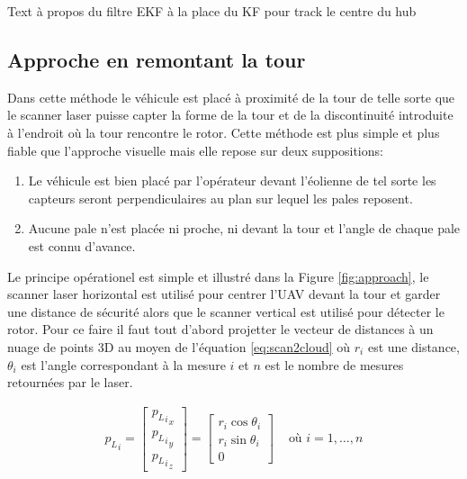 \color{red}
Text à propos du filtre EKF à la place du KF pour track le centre du hub
\color{black}

\subsection{Approche en remontant la tour}
\label{subsec:laser_tower}


Dans cette méthode le véhicule est placé à proximité de la tour de telle sorte que le scanner laser puisse capter la forme de la tour et de la discontinuité introduite à l'endroit où la tour rencontre le rotor. Cette méthode est plus simple et plus fiable que l'approche visuelle mais elle repose sur deux suppositions:
\begin{enumerate}
  \item Le véhicule est bien placé par l'opérateur devant l'éolienne de tel sorte les capteurs seront perpendiculaires au plan sur lequel les pales reposent.
  \item Aucune pale n'est placée ni proche, ni devant la tour et l'angle de chaque pale est connu d'avance.
\end{enumerate}

Le principe opérationel est simple et illustré dans la Figure \ref{fig:approach}, le scanner laser horizontal est utilisé pour centrer l'UAV devant la tour et garder une distance de sécurité alors que le scanner vertical est utilisé pour détecter le rotor. Pour ce faire il faut tout d'abord projetter le vecteur de distances à un nuage de points 3D au moyen de l'équation \ref{eq:scan2cloud} où $r_i$ est une distance, $\theta_i$ est l'angle correspondant à la mesure $i$ et $n$ est le nombre de mesures retournées par le laser.

\begin{align}
  {p_{L}}_i = \begin{bmatrix}
    {{p_L}_i}_x \\
    {{p_L}_i}_y \\
    {{p_L}_i}_z
  \end{bmatrix} = \begin{bmatrix}r_i \cos \theta_i \\ r_i \sin \theta_i \\ 0 \end{bmatrix} & \text{ où } i=1,\ldots,n
    \label{eq:scan2cloud}
\end{align}

